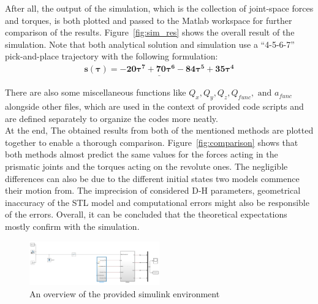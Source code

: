 \documentclass[conference]{IEEEtran}
\begin{document}
After all, the output of the simulation, which is the collection of joint-space forces and torques, is both plotted and passed to the Matlab workspace for further comparison of the results. Figure~\ref{fig:sim_res} shows the overall result of the simulation.
Note that both analytical solution and simulation use a ``4-5-6-7'' pick-and-place trajectory with the following formulation:
\begin{gather}
    \underline{\mathbf{s(\tau) = -20\tau^7 + 70\tau^6 - 84\tau^5 + 35\tau^4}}
\end{gather}

There are also some miscellaneous functions like $Q_x, Q_y, Q_z, Q_{func}, \text{ and } a_{func}$ alongside other files, which are used in the context of provided code scripts and are defined separately to organize the codes more neatly. \\

At the end, The obtained results from both of the mentioned methods are plotted together to enable a thorough comparison. Figure~\ref{fig:comparison} shows that both methods almost predict the same values for the forces acting in the prismatic joints and the torques acting on the revolute ones. The negligible differences can also be due to the different initial states two models commence their motion from. The imprecision of considered D-H parameters, geometrical inaccuracy of the STL model and computational errors might also be responsible of the errors. Overall, it can be concluded that the theoretical expectations mostly confirm with the simulation.

\begin{figure}[H]
    \centerline{\includegraphics[width=0.5\textwidth]{figures/simulink.png}}
    \caption{An overview of the provided simulink environment}
    \label{fig:simulink}
\end{figure}
\end{document}

